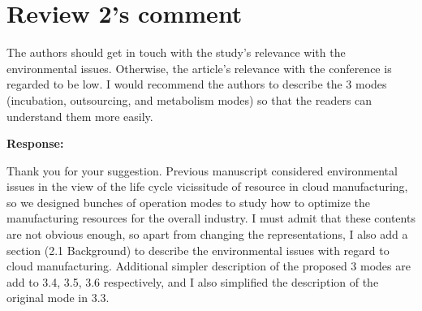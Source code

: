 \documentclass{article}
\begin{document}
\section*{Review 2's comment} %
The authors should get in touch with the study's relevance with the environmental issues. Otherwise, the article's relevance with the conference is regarded to be low.
I would recommend the authors to describe the 3 modes (incubation, outsourcing, and metabolism modes) so that the readers can understand them more easily.

\textbf{Response:}

Thank you for your suggestion. Previous manuscript considered environmental issues in the view of the life cycle vicissitude of resource in cloud manufacturing, so we designed bunches of operation modes to study how to optimize the manufacturing resources for the overall industry. I must admit that these contents are not obvious enough, so apart from changing the representations, I also add a section (2.1 Background) to describe the environmental issues with regard to cloud manufacturing. Additional simpler description of the proposed 3 modes are add to 3.4, 3.5, 3.6 respectively, and I also simplified the description of the original mode in 3.3.
\end{document}
